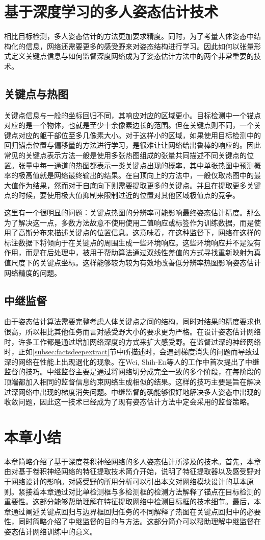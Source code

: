 \section{基于深度学习的多人姿态估计技术}
\label{sec:factspose}
相比目标检测，多人姿态估计的方法更加要求精度。同时，为了考量人体姿态中结构化的信息，网络还需要更多的感受野来对姿态结构进行学习。因此如何以张量形式定义关键点信息与如何监督深度网络成为了姿态估计方法中的两个非常重要的技术。

\subsection{关键点与热图}
\label{subsec:factsheatmaps}
关键点信息与一般的坐标回归不同，其响应对应的区域更小。目标检测中一个锚点对应的是一个物体，也就是至少十余像素边长的范围。但在关键点则不同，一个关键点对应的躯干部位至多几像素大小。对于这样小的区域，如果使用目标检测中的回归锚点位置与偏移量的方法进行学习，是很难让让网络给出鲁棒的响应的。因此常见的关键点表示方法一般是使用多张热图组成的张量共同描述不同关键点的位置。张量中每一通道的热图都表示一类关键点出现的概率，其中单张热图中预测概率的极高值就是网络最终输出的结果。在自顶向上的方法中，一般仅取热图中的最大值作为结果，然而对于自底向下则需要提取更多的关键点。并且在提取更多关键点的时候，要使用极大值抑制来限制过近的位置对其他区域极值点的竞争。

这里有一个很明显的问题：关键点热图的分辨率可能影响最终姿态估计精度。那么为了解决这一点，多数方法故意不使用使用二值响应或标签作为训练数据，而是使用了高斯分布来描述关键点的位置信息。这意味着，在这种监督下，网络在这样的标注数据下将倾向于在关键点的周围生成一些环境响应。这些环境响应并不是没有作用，而是在后处理中，被用于帮助算法通过双线性差值的方式寻找重新映射为真值尺度下的关键点坐标。这样能够较为较为有效地改善低分辨率热图影响姿态估计网络精度的问题。

\subsection{中继监督}
\label{subsec:factsintersupervision}
由于姿态估计算法需要完整考虑人体关键点之间的结构，同时对结果的精度要求也很高，所以相比其他任务而言对感受野大小的要求更为严格。在设计姿态估计网络时，许多工作都是通过增加网络深度的方式来扩大感受野。在监督过深的神经网络时，正如\ref{subsec:factsdeepextract}节中所描述时，会遇到梯度消失的问题而导致过深的网络在性能上出现退化的现象。在Wei, Shih-En等人的工作中\cite{wei2016convolutional}首次提出了中继监督的技巧。中继监督主要是通过将网络切分成完全一致的多个阶段，在每阶段的顶端都加入相同的监督信息约束网络生成相似的结果。这样的技巧主要是旨在解决过深网络中出现的梯度消失问题。中继监督的确能够很好地解决多人姿态中出现的收敛问题，因此这一技术已经成为了现有姿态估计方法中定会采用的监督策略。

\section{本章小结}
本章简略介绍了基于深度卷积神经网络的多人姿态估计所涉及的技术。首先，本章由对基于卷积神经网络的特征提取技术简介开始，说明了特征提取器以及感受野对于网络设计的影响。对感受野的所用分析可以引出本文对网络模块设计的基本原则。紧接着本章通过对比单检测框与多检测框的检测方法解释了锚点在目标检测的重要性。这部分能够帮助理解在特征提取网络中检测目标框的技术细节。最后，本章通过阐述关键点回归与边界框回归任务的不同解释了热图在关键点回归中的必要性，同时简略介绍了中继监督的目的与方法。这部分简介可以帮助理解中继监督在姿态估计网络训练中的意义。
